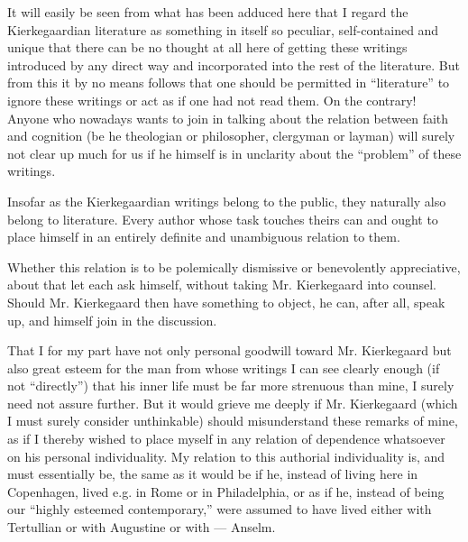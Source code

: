 \documentclass[12pt,a4paper,openany]{book}
\newcommand{\opage}[1]{\marginnote{\footnotesize\textit{[#1]}}}
\begin{document}
It will easily be seen from what has been adduced here that I regard
the Kierkegaardian literature as something in itself so
peculiar, self-contained and unique that there can be no thought
at all here of getting these writings introduced by any direct
way and incorporated into the rest of the literature. But
from this it by no means follows that one should be permitted in ``literature''
to ignore these writings or act as if one
had not read them. On the contrary! Anyone who nowadays
wants to join in talking about the relation between faith and cognition
(be he theologian or philosopher, clergyman or layman) will
surely not clear up much for us if he himself is
in unclarity about the ``problem'' of these writings.

Insofar as the Kierkegaardian writings belong to the public,
they naturally also belong to literature. Every
author whose task touches theirs can and ought to place himself
in an entirely definite and unambiguous relation to them.

Whether this relation is to be polemically dismissive or benevolently
appreciative, about that let each ask himself, without
taking Mr. Kierkegaard into counsel. Should Mr.
\setcounter{footnote}{0}%
\opage{74}Kierkegaard then have something to object, he can, after all, speak up, and himself
join in the discussion.

That I for my part have not only personal goodwill toward
Mr. Kierkegaard but also great esteem for the man
from whose writings I can see clearly enough (if not ``directly'')
that his inner life must be far more strenuous
than mine, I surely need not assure further. But
it would grieve me deeply if Mr. Kierkegaard
(which I must surely consider unthinkable) should misunderstand
these remarks of mine, as if I thereby wished to place
myself in any relation of dependence whatsoever on his personal individuality. My relation to this authorial individuality
is, and must essentially be, the same as it
would be if he, instead of living here in Copenhagen,
lived e.g. in Rome or in Philadelphia, or as if he,
instead of being our ``highly esteemed contemporary,'' were assumed to have
lived either with Tertullian or with Augustine or with
--- Anselm.
\end{document}
